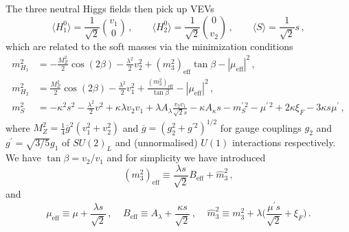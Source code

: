 \documentclass[final,3p,times,pdflatex]{elsarticle}
\newcommand{\be}{\begin{equation}}
\newcommand{\ee}{\end{equation}}
\newcommand{\ds}{\displaystyle}
\newcommand{\lamsq}{\lambda^2}
\begin{document}
\noindent The three neutral Higgs fields then pick up VEVs
%  
\be 
        \langle H_1^0 \rangle = \ds\frac{1}{\sqrt{2}}{v_1 \choose 0}\,, 
\qquad  \langle H_2^0 \rangle = \ds\frac{1}{\sqrt{2}}{0 \choose v_2}\,, 
\qquad  \langle S \rangle =  \ds\frac{1}{\sqrt{2}}s\,, 
\label{eq:potmin} 
\ee
%  
\noindent which are related to the soft masses via the minimization conditions
%
\begin{align}
m_{H_1}^2&= -\frac{M_Z^2}{2}\cos(2\beta) - \ds\frac{\lamsq}{2} v_2^2
 + (m_3^2)_\textrm{eff} \tan\beta 
- |\mu_\textrm{eff}|^2\,, \label{eq:mind}\\
m_{H_2}^2&= \frac{M_Z^2}{2}\cos(2\beta) - \ds\frac{\lamsq}{2}v_1^2 
+  \frac{(m_3^2)_\textrm{eff}}{\tan\beta} 
- |\mu_\textrm{eff}|^2 \,, \label{eq:minu} \\
m_S^2 &= -\kappa^2 s^2 - \ds\frac{\lamsq}{2} 
v^2 + \kappa\lambda v_2v_1
+ \lambda A_{\lambda} \frac{v_2v_1}{\sqrt{2}s}
-\kappa A_{\kappa}s  - m^{\prime \,2}_S - \mu^{\prime \,2} + 2 \kappa \xi_F  - 3 \kappa s \mu^\prime \,,
\label{eq:mins}
\end{align}
where $M_Z^2 = \tfrac{1}{4}\bar{g}^2(v_1^2+v_2^2)$ and $\overline{g} = (g_2^2+g^{\prime 2})^{1/2}$ 
for gauge couplings $g_2$ and $g^{\prime}=\sqrt{3/5}g_1$ of $SU(2)_L$ and (unnormalised) 
$U(1)$ interactions respectively.
%
We have $\tan \beta = v_2 /  v_1$ and for simplicity we have introduced
\be (m_3^2)_\textrm{eff} \equiv
 \ds\frac{ \lambda s}{\sqrt{2}} B_\textrm{eff} + \widehat{m}_3^2\,, \ee and
\be  \mu_\textrm{eff} \equiv
 \mu + \frac{\lambda s}{\sqrt{2}}\,, \;\;\;\; B_\textrm{eff}\equiv A_\lambda+\ds\frac{\kappa s}{\sqrt{2}}\,, \;\;\;\; \widehat{m}_3^2 \equiv m_3^2 + \lambda \Bigg(\ds\frac{\mu^\prime s}{\sqrt{2}} + \xi_F\Bigg)\,. \ee


 
\end{document}
